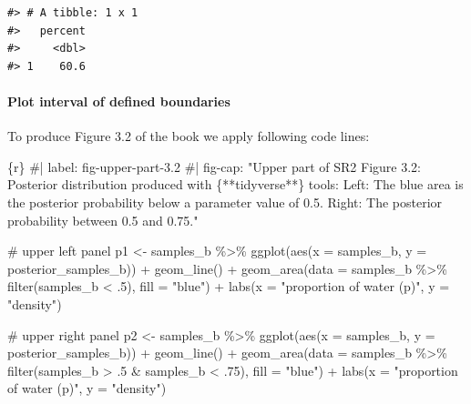 \documentclass[
  letterpaper,
  DIV=11,
  numbers=noendperiod]{scrreprt}
\let\oldparagraph\paragraph
\renewcommand{\paragraph}[1]{\oldparagraph{#1}\mbox{}}
\newenvironment{Shaded}{\begin{snugshade}}{\end{snugshade}}
\newcommand{\AttributeTok}[1]{\textcolor[rgb]{0.40,0.45,0.13}{#1}}
\newcommand{\CommentTok}[1]{\textcolor[rgb]{0.37,0.37,0.37}{#1}}
\newcommand{\DecValTok}[1]{\textcolor[rgb]{0.68,0.00,0.00}{#1}}
\newcommand{\FunctionTok}[1]{\textcolor[rgb]{0.28,0.35,0.67}{#1}}
\newcommand{\InformationTok}[1]{\textcolor[rgb]{0.37,0.37,0.37}{#1}}
\newcommand{\NormalTok}[1]{\textcolor[rgb]{0.00,0.23,0.31}{#1}}
\newcommand{\OtherTok}[1]{\textcolor[rgb]{0.00,0.23,0.31}{#1}}
\newcommand{\SpecialCharTok}[1]{\textcolor[rgb]{0.37,0.37,0.37}{#1}}
\newcommand{\StringTok}[1]{\textcolor[rgb]{0.13,0.47,0.30}{#1}}
\begin{document}
\begin{verbatim}
#> # A tibble: 1 x 1
#>   percent
#>     <dbl>
#> 1    60.6
\end{verbatim}

\hypertarget{plot-interval-of-defined-boundaries}{%
\paragraph{Plot interval of defined
boundaries}\label{plot-interval-of-defined-boundaries}}

To produce Figure 3.2 of the book we apply following code lines:

\begin{Shaded}
\begin{Highlighting}[]
\InformationTok{\textasciigrave{}\textasciigrave{}\textasciigrave{}\{r\}}
\CommentTok{\#| label: fig{-}upper{-}part{-}3.2}
\CommentTok{\#| fig{-}cap: "Upper part of SR2 Figure 3.2: Posterior distribution produced with \{**tidyverse**\} tools: Left: The blue area is the posterior probability below a parameter value of 0.5. Right: The posterior probability between 0.5 and 0.75."}

\CommentTok{\# upper left panel}
\NormalTok{p1 }\OtherTok{\textless{}{-}}
\NormalTok{  samples\_b }\SpecialCharTok{\%\textgreater{}\%} 
  \FunctionTok{ggplot}\NormalTok{(}\FunctionTok{aes}\NormalTok{(}\AttributeTok{x =}\NormalTok{ samples\_b, }\AttributeTok{y =}\NormalTok{ posterior\_samples\_b)) }\SpecialCharTok{+}
  \FunctionTok{geom\_line}\NormalTok{() }\SpecialCharTok{+}
  \FunctionTok{geom\_area}\NormalTok{(}\AttributeTok{data =}\NormalTok{ samples\_b }\SpecialCharTok{\%\textgreater{}\%} \FunctionTok{filter}\NormalTok{(samples\_b }\SpecialCharTok{\textless{}}\NormalTok{ .}\DecValTok{5}\NormalTok{), }\AttributeTok{fill =} \StringTok{"blue"}\NormalTok{) }\SpecialCharTok{+}
  \FunctionTok{labs}\NormalTok{(}\AttributeTok{x =} \StringTok{"proportion of water (p)"}\NormalTok{,}
       \AttributeTok{y =} \StringTok{"density"}\NormalTok{)}

\CommentTok{\# upper right panel}
\NormalTok{p2 }\OtherTok{\textless{}{-}} 
\NormalTok{  samples\_b }\SpecialCharTok{\%\textgreater{}\%} 
  \FunctionTok{ggplot}\NormalTok{(}\FunctionTok{aes}\NormalTok{(}\AttributeTok{x =}\NormalTok{ samples\_b, }\AttributeTok{y =}\NormalTok{ posterior\_samples\_b)) }\SpecialCharTok{+}
  \FunctionTok{geom\_line}\NormalTok{() }\SpecialCharTok{+}
  \FunctionTok{geom\_area}\NormalTok{(}\AttributeTok{data =}\NormalTok{ samples\_b }\SpecialCharTok{\%\textgreater{}\%} \FunctionTok{filter}\NormalTok{(samples\_b }\SpecialCharTok{\textgreater{}}\NormalTok{ .}\DecValTok{5} \SpecialCharTok{\&}\NormalTok{ samples\_b }\SpecialCharTok{\textless{}}\NormalTok{ .}\DecValTok{75}\NormalTok{), }\AttributeTok{fill =} \StringTok{"blue"}\NormalTok{) }\SpecialCharTok{+}
  \FunctionTok{labs}\NormalTok{(}\AttributeTok{x =} \StringTok{"proportion of water (p)"}\NormalTok{,}
       \AttributeTok{y =} \StringTok{"density"}\NormalTok{)}


\end{Highlighting}
\end{Shaded}
\end{document}
